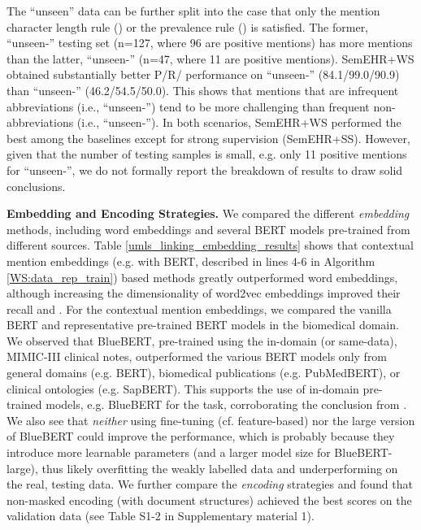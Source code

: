 \documentclass[twocolumn]{bmcart}
\begin{document}
The ``unseen'' data can be further split into the case that only the mention character length rule () or the prevalence rule () is satisfied. The former, ``unseen-'' testing set (n=127, where 96 are positive mentions) has more mentions than the latter, ``unseen-'' (n=47, where 11 are positive mentions). SemEHR+WS obtained substantially better P/R/ performance on ``unseen-'' (84.1/99.0/90.9) than ``unseen-'' (46.2/54.5/50.0). This shows that mentions that are infrequent abbreviations (i.e., ``unseen-'') tend to be more challenging than frequent non-abbreviations (i.e., ``unseen-''). In both scenarios, SemEHR+WS performed the best  among the baselines except for strong supervision (SemEHR+SS). However, given that the number of testing samples is small, e.g. only 11 positive mentions for ``unseen-'', we do not formally report the breakdown of results to draw solid conclusions.

\textbf{Embedding and Encoding Strategies.} We compared the different \emph{embedding} methods, including word embeddings and several BERT models pre-trained from different sources. Table \ref{umls_linking_embedding_results} shows that contextual mention embeddings (e.g. with BERT, described in lines 4-6 in Algorithm \ref{WS:data_rep_train}) based methods greatly outperformed word embeddings, although increasing the dimensionality of word2vec embeddings improved their recall and . For the contextual mention embeddings, we compared the vanilla BERT and representative pre-trained BERT models in the biomedical domain. We observed that BlueBERT, pre-trained using the in-domain (or same-data), MIMIC-III clinical notes, outperformed the various BERT models only from general domains (e.g. BERT), biomedical publications (e.g. PubMedBERT), or clinical ontologies (e.g. SapBERT). This supports the use of in-domain pre-trained models, e.g. BlueBERT for the task, corroborating the conclusion from \cite{gururangan2020}. We also see that \textit{neither} using fine-tuning (cf. feature-based) nor the large version of BlueBERT could improve the performance, which is probably because they introduce more learnable parameters (and a larger model size for BlueBERT-large), thus likely overfitting the weakly labelled data and underperforming on the real, testing data. We further compare the \emph{encoding} strategies and found that non-masked encoding (with document structures) achieved the best  scores on the validation data (see Table S1-2 in Supplementary material 1).
\end{document}
